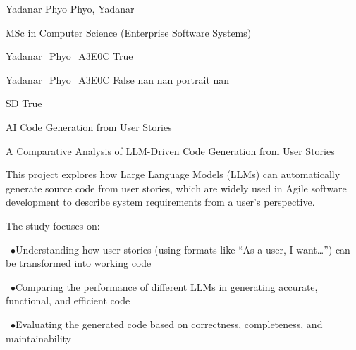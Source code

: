 \documentclass[twoside]{report}
\begin{document}
\begingroup{}\relax



\def\Key{Yadanar_Phyo_A3E0C}

{Yadanar Phyo}
{Phyo, Yadanar}

{MSc in Computer Science (Enterprise Software Systems)}

{Yadanar_Phyo_A3E0C}
{True}

{Yadanar_Phyo_A3E0C}
{False}
{nan}
{nan}
{portrait}
{nan}

{SD}
{True}

{AI Code Generation from User Stories}

{A Comparative Analysis of LLM-Driven Code Generation from User Stories}

{This project explores how Large Language Models (LLMs) can automatically generate source code from user stories, which are widely used in Agile software development to describe system requirements from a user's perspective.

The study focuses on:\par\ $\bullet$\quad Understanding how user stories (using formats like “As a user, I want…”) can be transformed into working code\par\ $\bullet$\quad Comparing the performance of different LLMs in generating accurate, functional, and efficient code\par\ $\bullet$\quad Evaluating the generated code based on correctness, completeness, and maintainability}
\end{document}
